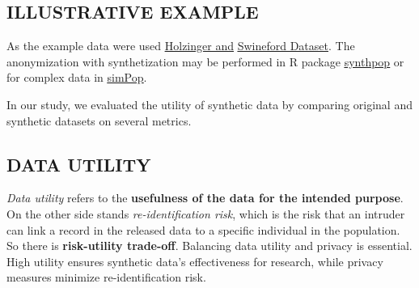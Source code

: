 \documentclass[a0,portrait]{a0poster}
\begin{document}
\begin{multicols}{3}
\section{ILLUSTRATIVE EXAMPLE}

As the example data were used 
\href{https://rdrr.io/cran/lavaan/man/HolzingerSwineford1939.html}{\color{blue}\underline{Holzinger and}} 
\href{https://rdrr.io/cran/lavaan/man/HolzingerSwineford1939.html}
{\color{blue}\underline{Swineford Dataset}}.
The anonymization with synthetization may be performed in R package \href{https://cran.r-project.org/web/packages/synthpop/index.html}{\color{blue}\underline{synthpop}}
 or for complex data in \href{https://cran.r-project.org/web/packages/simPop/index.html}{\color{blue}\underline{simPop}}.

\vspace{1cm}

In our study, we evaluated the utility of synthetic data by comparing original and synthetic datasets on several metrics.

\subsection{DATA UTILITY}

\textit{Data utility} refers to the \textbf{usefulness of the data for the intended purpose}. On the other side stands \textit{re-identification risk}, which is the risk that an intruder can link a record in the released data to a specific individual in the population. So there is \textbf{risk-utility trade-off}.
Balancing data utility and privacy is essential. High utility ensures synthetic data's effectiveness for research, while privacy measures minimize re-identification risk.



\end{multicols}
\end{document}
